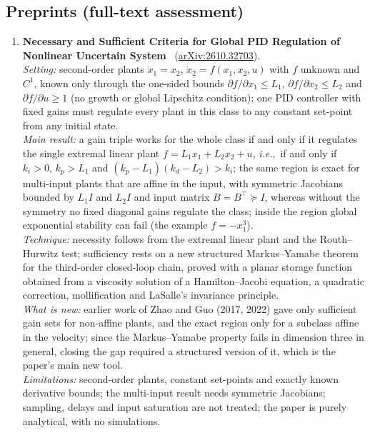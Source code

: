 \documentclass[11pt,a4paper]{article}
\newcommand{\ie}{\emph{i.e.},\ }
\begin{document}
\subsection*{Preprints (full-text assessment)}
\begin{enumerate}[leftmargin=*]
  \item \textbf{Necessary and Sufficient Criteria for Global PID Regulation of Nonlinear Uncertain System}~\cite{zhao2026necessary} (\href{https://arxiv.org/abs/2610.32703}{arXiv:2610.32703}).\\
  \emph{Setting:} second-order plants $\dot x_1 = x_2$, $\dot x_2 = f(x_1,x_2,u)$ with $f$ unknown and $C^1$, known only through the one-sided bounds $\partial f/\partial x_1 \le L_1$, $\partial f/\partial x_2 \le L_2$ and $\partial f/\partial u \ge 1$ (no growth or global Lipschitz condition); one \ac{PID} controller with fixed gains must regulate every plant in this class to any constant set-point from any initial state.\\
  \emph{Main result:} a gain triple works for the whole class if and only if it regulates the single extremal linear plant $f = L_1x_1 + L_2x_2 + u$, \ie if and only if $k_i > 0$, $k_p > L_1$ and $(k_p - L_1)(k_d - L_2) > k_i$; the same region is exact for multi-input plants that are affine in the input, with symmetric Jacobians bounded by $L_1 I$ and $L_2 I$ and input matrix $B = B^\top \succeq I$, whereas without the symmetry no fixed diagonal gains regulate the class; inside the region global exponential stability can fail (the example $f = -x_1^3$).\\
  \emph{Technique:} necessity follows from the extremal linear plant and the Routh--Hurwitz test; sufficiency rests on a new structured Markus--Yamabe theorem for the third-order closed-loop chain, proved with a planar storage function obtained from a viscosity solution of a Hamilton--Jacobi equation, a quadratic correction, mollification and LaSalle's invariance principle.\\
  \emph{What is new:} earlier work of Zhao and Guo (2017, 2022) gave only sufficient gain sets for non-affine plants, and the exact region only for a subclass affine in the velocity; since the Markus--Yamabe property fails in dimension three in general, closing the gap required a structured version of it, which is the paper's main new tool.\\
  \emph{Limitations:} second-order plants, constant set-points and exactly known derivative bounds; the multi-input result needs symmetric Jacobians; sampling, delays and input saturation are not treated; the paper is purely analytical, with no simulations.\\

\end{enumerate}
\end{document}
